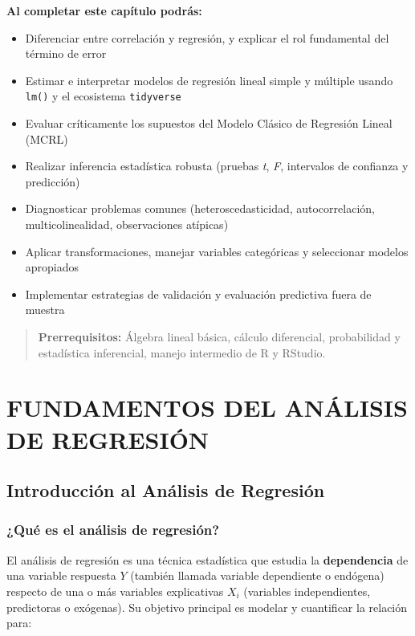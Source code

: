 \documentclass[
  oneside]{book}
\providecommand{\tightlist}{%
  \setlength{\itemsep}{0pt}\setlength{\parskip}{0pt}}
\begin{document}
\textbf{Al completar este capítulo podrás:}

\begin{itemize}
\tightlist
\item
  Diferenciar entre correlación y regresión, y explicar el rol fundamental del término de error
\item
  Estimar e interpretar modelos de regresión lineal simple y múltiple usando \texttt{lm()} y el ecosistema \texttt{tidyverse}
\item
  Evaluar críticamente los supuestos del Modelo Clásico de Regresión Lineal (MCRL)
\item
  Realizar inferencia estadística robusta (pruebas \emph{t}, \emph{F}, intervalos de confianza y predicción)
\item
  Diagnosticar problemas comunes (heteroscedasticidad, autocorrelación, multicolinealidad, observaciones atípicas)
\item
  Aplicar transformaciones, manejar variables categóricas y seleccionar modelos apropiados
\item
  Implementar estrategias de validación y evaluación predictiva fuera de muestra
\end{itemize}

\begin{quote}
\textbf{Prerrequisitos:} Álgebra lineal básica, cálculo diferencial, probabilidad y estadística inferencial, manejo intermedio de R y RStudio.
\end{quote}

\section{FUNDAMENTOS DEL ANÁLISIS DE REGRESIÓN}\label{fundamentos-del-anuxe1lisis-de-regresiuxf3n}

\subsection{Introducción al Análisis de Regresión}\label{introducciuxf3n-al-anuxe1lisis-de-regresiuxf3n}

\subsubsection{¿Qué es el análisis de regresión?}\label{quuxe9-es-el-anuxe1lisis-de-regresiuxf3n}

El análisis de regresión es una técnica estadística que estudia la \textbf{dependencia} de una variable respuesta \(Y\) (también llamada variable dependiente o endógena) respecto de una o más variables explicativas \(X_i\) (variables independientes, predictoras o exógenas). Su objetivo principal es modelar y cuantificar la relación para:
\end{document}
